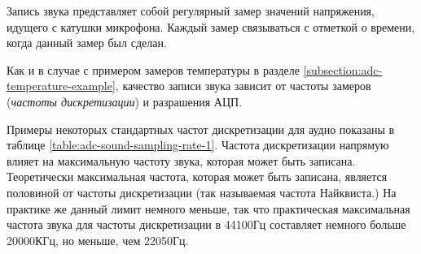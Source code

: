 \documentclass[../sparc.tex]{subfiles}
\begin{document}
Запись звука представляет собой регулярный замер значений напряжения, идущего с
катушки микрофона.  Каждый замер связываться с отметкой о времени, когда данный
замер был сделан.

Как и в случае с примером замеров температуры в разделе
\ref{subsection:adc-temperature-example}, качество записи звука зависит от
частоты замеров (\emph{частоты дискретизации}) и разрашения АЦП.

Примеры некоторых стандартных частот дискретизации для аудио показаны в таблице
\ref{table:adc-sound-sampling-rate-1}.  Частота дискретизации напрямую влияет на
максимальную частоту звука, которая может быть записана.  Теоретически
максимальная частота, которая может быть записана, является половиной от частоты
дискретизации (так называемая частота Найквиста.)  На практике же данный лимит
немного меньше, так что практическая максимальная частота звука для частоты
дискретизации в 44100Гц составляет немного больше 20000КГц, но меньше, чем
22050Гц. \cite{audacityteam:sample-rates}

\end{document}
